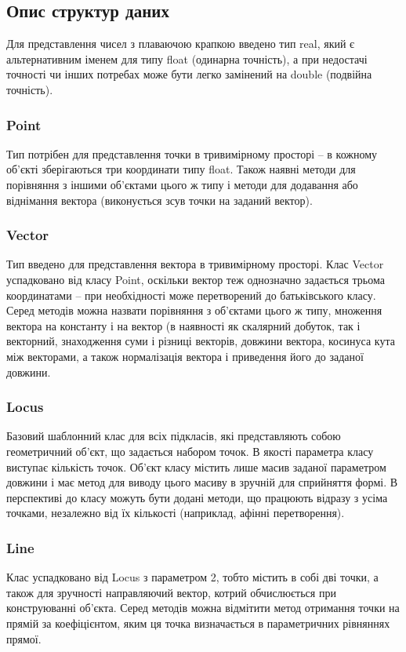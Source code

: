 \documentclass[a4paper,12pt]{article}
\begin{document}
\subsection{Опис структур даних}
Для представлення чисел з плаваючою крапкою введено тип real, який є альтернативним іменем для типу float (одинарна точність), а при недостачі точності чи інших потребах може бути легко замінений на double (подвійна точність).

\subsubsection{Point}
Тип потрібен для представлення точки в тривимірному просторі -- в кожному об’єкті зберігаються три координати типу float. Також наявні методи для порівняння з іншими об’єктами цього ж типу і методи для додавання або віднімання вектора (виконується зсув точки на заданий вектор).

\subsubsection{Vector}
Тип введено для представлення вектора в тривимірному просторі. Клас Vector успадковано від класу Point, оскільки вектор теж однозначно задається трьома координатами -- при необхідності може перетворений до батьківського класу. Серед методів можна назвати порівняння з об’єктами цього ж типу, множення вектора на константу і на вектор (в наявності як скалярний добуток, так і векторний, знаходження суми і різниці векторів, довжини вектора, косинуса кута між векторами, а також нормалізація вектора і приведення його до заданої довжини.

\subsubsection{Locus}
Базовий шаблонний клас для всіх підкласів, які представляють собою геометричний об'єкт, що задається набором точок. В якості параметра класу виступає кількість точок. Об’єкт класу містить лише масив заданої параметром довжини і має метод для виводу цього масиву в зручній для сприйняття формі. В перспективі до класу можуть бути додані методи, що працюють відразу з усіма точками, незалежно від їх кількості (наприклад, афінні перетворення).

\subsubsection{Line}
Клас успадковано від Locus з параметром 2, тобто містить в собі дві точки, а також для зручності направляючий вектор, котрий обчислюється при конструюванні об’єкта. Серед методів можна відмітити метод отримання точки на прямій за коефіцієнтом, яким ця точка визначається в параметричних рівняннях прямої.
\end{document}
